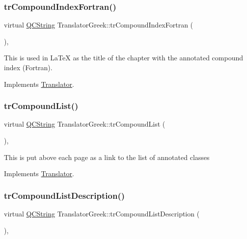 \subsubsection{\texorpdfstring{trCompoundIndexFortran()}{trCompoundIndexFortran()}}
{\footnotesize\ttfamily virtual \mbox{\hyperlink{class_q_c_string}{Q\+C\+String}} Translator\+Greek\+::tr\+Compound\+Index\+Fortran (\begin{DoxyParamCaption}{ }\end{DoxyParamCaption})\hspace{0.3cm}{\ttfamily [inline]}, {\ttfamily [virtual]}}

This is used in La\+TeX as the title of the chapter with the annotated compound index (Fortran). 

Implements \mbox{\hyperlink{class_translator}{Translator}}.

\mbox{\label{class_translator_greek_a8c7ff45b5ffe928c2a2933152c83dddd}} 
\subsubsection{\texorpdfstring{trCompoundList()}{trCompoundList()}}
{\footnotesize\ttfamily virtual \mbox{\hyperlink{class_q_c_string}{Q\+C\+String}} Translator\+Greek\+::tr\+Compound\+List (\begin{DoxyParamCaption}{ }\end{DoxyParamCaption})\hspace{0.3cm}{\ttfamily [inline]}, {\ttfamily [virtual]}}

This is put above each page as a link to the list of annotated classes 

Implements \mbox{\hyperlink{class_translator}{Translator}}.

\mbox{\label{class_translator_greek_a807afd594171efe507995437fecbe912}} 
\subsubsection{\texorpdfstring{trCompoundListDescription()}{trCompoundListDescription()}}
{\footnotesize\ttfamily virtual \mbox{\hyperlink{class_q_c_string}{Q\+C\+String}} Translator\+Greek\+::tr\+Compound\+List\+Description (\begin{DoxyParamCaption}{ }\end{DoxyParamCaption})\hspace{0.3cm}{\ttfamily [inline]}, {\ttfamily [virtual]}}

